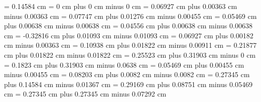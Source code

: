 


\gre@additionallineswidth = 0.14584 cm
\gre@zerowidthspace = 0 cm plus 0 cm minus 0 cm
\gre@interglyphspace = 0.06927 cm plus 0.00363 cm minus 0.00363 cm
\gre@alterationspace = 0.07747 cm plus 0.01276 cm minus 0.00455 cm
\gre@clefflatspace = 0.05469 cm plus 0.00638 cm minus 0.00638 cm
\gre@beforechoralsignspace = 0.04556 cm plus 0.00638 cm minus 0.00638 cm
\gre@beforealterationspace = -0.32816 cm plus 0.01093 cm minus 0.01093 cm
\gre@interelementspace = 0.06927 cm plus 0.00182 cm minus 0.00363 cm
\gre@largerspace = 0.10938 cm plus 0.01822 cm minus 0.00911 cm
\gre@glyphspace = 0.21877 cm plus 0.01822 cm minus 0.01822 cm
\gre@intersyllablespace= 0.25523 cm plus 0.31903 cm minus 0 cm
\gre@spacebeforecusto = 0.1823 cm plus 0.31903 cm minus 0.0638 cm
\gre@spacebeforesigns= 0.05469 cm plus 0.00455 cm minus 0.00455 cm
\gre@spaceaftersigns= 0.08203 cm plus 0.0082 cm minus 0.0082 cm
\gre@spaceafterlineclef = 0.27345 cm plus 0.14584 cm minus 0.01367 cm
\gre@interwordspacenotes = 0.29169 cm plus 0.08751 cm minus 0.05469 cm
\gre@interwordspacenotestext = 0.27345 cm plus 0.27345 cm minus 0.07292 cm
